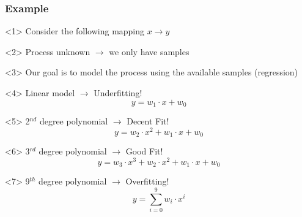 \begin{frame}
  \frametitle{Example}
  \begin{onlyenv}<1>
    Consider the following mapping $x \rightarrow y$
    \begin{center}
      \scalebox{0.5}{
        
      }
    \end{center}
  \end{onlyenv}
  \begin{onlyenv}<2>
    Process unknown \(\rightarrow\) we only have samples
    \begin{center}
      \scalebox{0.5}{
        
      }
    \end{center}
  \end{onlyenv}
  \begin{onlyenv}<3>
    Our goal is to model the process using the available samples (regression)
    \vspace{1cm}\\
  \end{onlyenv}
  \begin{onlyenv}<4>
    Linear model \(\rightarrow\) Underfitting!
    \begin{equation*}
      y = w_1\cdot x + w_0
    \end{equation*}
    \begin{center}
      \scalebox{0.5}{
        
      }
    \end{center}
  \end{onlyenv}
  \begin{onlyenv}<5>
    2$^{nd}$ degree polynomial \(\rightarrow\) Decent Fit!
    \begin{equation*}
      y = w_2\cdot x^2 + w_1\cdot x + w_0
    \end{equation*}
    \begin{center}
      \scalebox{0.5}{
        
      }
    \end{center}
  \end{onlyenv}
  \begin{onlyenv}<6>
    3$^{rd}$ degree polynomial \(\rightarrow\) Good Fit!
    \begin{equation*}
      y = w_3\cdot x^3 + w_2\cdot x^2 + w_1\cdot x + w_0
    \end{equation*}
    \begin{center}
      \scalebox{0.5}{
        
      }
    \end{center}
  \end{onlyenv}
  \begin{onlyenv}<7>
    9$^{th}$ degree polynomial \(\rightarrow\) Overfitting!
    \begin{equation*}
      y = \sum_{i=0}^{9}w_i\cdot x^{i}
    \end{equation*}
    \begin{center}
      \scalebox{0.5}{
        
      }
    \end{center}
  \end{onlyenv}
\end{frame}

